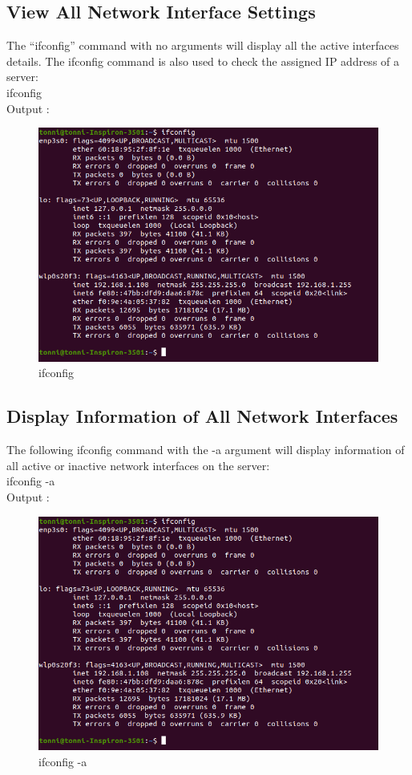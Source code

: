 \documentclass[11pt]{article}
\begin{document}
\subsection{ View All Network Interface Settings}
The “ifconfig” command with no arguments will display all the active interfaces details. The ifconfig command is also used to check the assigned IP address of a server:\\[6pt]
  ifconfig\\[12pt]   
        Output : 
  \begin{figure}[!h]
\centering
\includegraphics[width=\textwidth]{ifconfig.png}
\caption{ifconfig}
\end{figure}

\subsection{ Display Information of All Network Interfaces}
The following ifconfig command with the -a argument will display information of all active or inactive network interfaces on the server:\\[6pt]
  ifconfig -a\\[12pt]   
        Output : 
  \begin{figure}[!h]
\centering
\includegraphics[width=\textwidth]{a_ifconfig.png}
\caption{ifconfig -a}
\end{figure}
\\[92pt]
\end{document}
